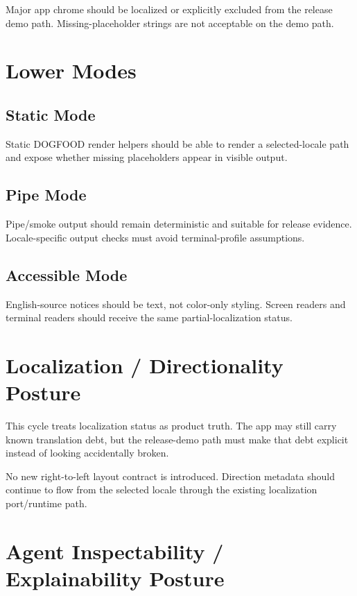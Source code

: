 Major app chrome should be localized or explicitly excluded from the release demo path. Missing-placeholder strings are not acceptable on the demo path.

\section{Lower Modes}\label{record-196-lower-modes}

\subsection{Static Mode}\label{record-196-static-mode}

Static DOGFOOD render helpers should be able to render a selected-locale path and expose whether missing placeholders appear in visible output.

\subsection{Pipe Mode}\label{record-196-pipe-mode}

Pipe/smoke output should remain deterministic and suitable for release evidence. Locale-specific output checks must avoid terminal-profile assumptions.

\subsection{Accessible Mode}\label{record-196-accessible-mode}

English-source notices should be text, not color-only styling. Screen readers and terminal readers should receive the same partial-localization status.

\section{Localization / Directionality Posture}\label{record-196-localization-directionality-posture}

This cycle treats localization status as product truth. The app may still carry known translation debt, but the release-demo path must make that debt explicit instead of looking accidentally broken.

No new right-to-left layout contract is introduced. Direction metadata should continue to flow from the selected locale through the existing localization port/runtime path.

\section{Agent Inspectability / Explainability Posture}\label{record-196-agent-inspectability-explainability-posture}

